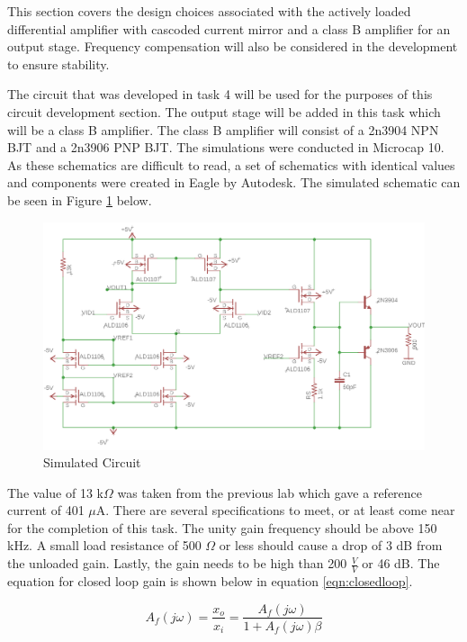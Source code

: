 


This section covers the design choices associated with the actively loaded differential amplifier with cascoded current mirror and a class B amplifier for an output stage. Frequency compensation will also be considered in the development to ensure stability.

The circuit that was developed in task 4 will be used for the purposes of this circuit development section. The output stage will be added in this task which will be a class B amplifier. The class B amplifier will consist of a 2n3904 NPN BJT and a 2n3906 PNP BJT. The simulations were conducted in Microcap 10. As these schematics are difficult to read, a set of schematics with identical values and components were created in Eagle by Autodesk. The simulated schematic can be seen in Figure \ref{fig:simschem} below.

\begin{figure}[H]
	\centering
	\includegraphics[width=0.8\linewidth]{CircuitDevelopment/schematicsimulation.png}
	\caption{Simulated Circuit}
	\label{fig:simschem}
\end{figure}

The value of 13 k$\Omega$ was taken from the previous lab which gave a reference current of 401 $\mu$A. There are several specifications to meet, or at least come near for the completion of this task. The unity gain frequency should be above 150 kHz. A small load resistance of 500 $\Omega$ or less should cause a drop of 3 dB from the unloaded gain. Lastly, the gain needs to be high than 200 $\frac{V}{V}$ or 46 dB. The equation for closed loop gain is shown below in equation \ref{eqn:closedloop}.

\begin{equation}
A_f(j\omega) = \frac{x_o}{x_i} = \frac{A_f(j\omega)}{1+A_f(j\omega)\beta}
\label{eqn:closedloop}
\end{equation}

